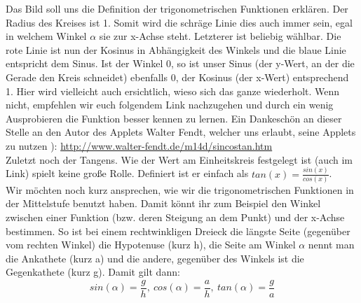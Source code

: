    Das Bild soll uns die Definition der trigonometrischen Funktionen erklären. Der Radius des Kreises ist 1. Somit wird die schräge Linie dies auch immer sein, egal in welchem Winkel \(\alpha\) sie zur x-Achse steht. Letzterer ist beliebig wählbar. Die rote Linie ist nun der Kosinus in Abhängigkeit des Winkels und die blaue Linie entspricht dem Sinus. Ist der Winkel 0, so ist unser Sinus (der y-Wert, an der die Gerade den Kreis schneidet) ebenfalls 0, der Kosinus (der x-Wert) entsprechend 1. Hier wird vielleicht auch ersichtlich, wieso sich das ganze wiederholt. Wenn nicht, empfehlen wir euch folgendem Link nachzugehen und durch ein wenig Ausprobieren die Funktion besser kennen zu lernen. Ein Dankeschön an dieser Stelle an den Autor des Applets Walter Fendt, welcher uns erlaubt, seine Applets zu nutzen ): \url{http://www.walter-fendt.de/m14d/sincostan.htm}\\
Zuletzt noch der Tangens. Wie der Wert am Einheitskreis festgelegt ist (auch im Link) spielt keine große Rolle. Definiert ist er einfach als \(tan(x)=\frac{sin(x)}{cos(x)}\).\\
Wir möchten noch kurz ansprechen, wie wir die trigonometrischen Funktionen in der Mittelstufe benutzt haben. Damit könnt ihr zum Beispiel den Winkel zwischen einer Funktion (bzw. deren Steigung an dem Punkt) und der x-Achse bestimmen. So ist bei einem rechtwinkligen Dreieck die längste Seite (gegenüber vom rechten Winkel) die Hypotenuse (kurz h), die Seite am Winkel \(\alpha\) nennt man die Ankathete (kurz a) und die andere, gegenüber des Winkels ist die Gegenkathete (kurz g). Damit gilt dann:
\[sin(\alpha)=\frac{g}{h},\ cos(\alpha)=\frac{a}{h},\ tan(\alpha)=\frac{g}{a}\]

